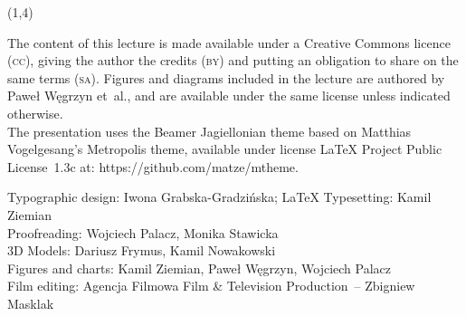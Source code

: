 {\begin{frame}[standout]
\begin{textblock}{4.2}
    \end{textblock}





    \begin{textblock}{11}(1,4)

      \begin{flushleft}

        \mdseries

        \footnotesize

        \RaggedRight

        \color{jFrametitleFGColor}

        The content of this lecture is made available under a Creative
        Commons licence (\textsc{cc}), giving the author the credits
        (\textsc{by}) and putting an obligation to share on the same terms
        (\textsc{sa}). Figures and diagrams included in the lecture are
        authored by Paweł Węgrzyn et~al., and are available under the same
        license unless indicated otherwise.\\ The presentation uses the
        Beamer Jagiellonian theme based on Matthias Vogelgesang’s
        Metropolis theme, available under license \LaTeX{} Project
        Public License~1.3c at: 
        {https://github.com/matze/mtheme}.

        Typographic design: Iwona Grabska-Gradzińska;
        \LaTeX{} Typesetting: Kamil Ziemian \\
        Proofreading: Wojciech Palacz,
        Monika Stawicka \\
        3D Models: Dariusz Frymus, Kamil Nowakowski \\
        Figures and charts: Kamil Ziemian, Paweł Węgrzyn,
        Wojciech Palacz \\
        Film editing: Agencja Filmowa Film \& Television Production~--
        Zbigniew Masklak

      \end{flushleft}

    \end{textblock}

  \end{frame}





  \begin{frame}[standout]


    \begingroup

    \color{jFrametitleFGColor}

    #1

    \endgroup

  \end{frame}
}



